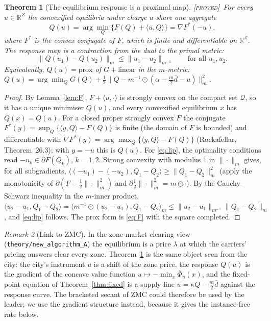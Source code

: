 \documentclass[11pt]{article}
\newtheorem{theorem}{Theorem}
\theoremstyle{definition}
\theoremstyle{remark}
\newtheorem{remark}[theorem]{Remark}
\newcommand{\R}{\mathbb{R}}
\newcommand{\cQ}{\mathcal{Q}}
\newcommand{\ip}[2]{\langle #1,#2\rangle}
\newcommand{\Qbar}{\bar Q}
\newcommand{\dbar}{\bar d}
\newcommand{\Phibar}{\overline{\Phi}}
\newcommand{\norm}[2]{\|#1\|_{#2}}
\newcommand{\PROVED}{{\normalfont\textsc{[proved]}}}
\begin{document}
\begin{theorem}[The equilibrium response is a proximal map]\label{thm:resolvent}\PROVED\
For every $u\in\R^Z$ the convexified equilibria under charge $u$ share one aggregate
\[Q(u)=\arg\min_Q\big\{F(Q)+\ip{u}{Q}\big\}=\nabla F^*(-u),\]
where $F^*$ is the convex conjugate of $F$, which is finite and differentiable on $\R^Z$. The response map is a contraction from the dual to the primal metric:
\begin{equation}\label{eq:lip}
\norm{Q(u_1)-Q(u_2)}{m}\le\norm{u_1-u_2}{m^{-1}}\qquad\text{for all }u_1,u_2 .
\end{equation}
Equivalently, $Q(u)=\mathrm{prox}$ of $G+\text{linear}$ in the $m$-metric: $Q(u)=\arg\min_Q G(Q)+\tfrac12\norm{Q-m^{-1}\odot(\alpha-\tfrac m2\dbar-u)}{m}^2$.
\end{theorem}
\begin{proof}
By Lemma~\ref{lem:F}, $F+\ip{u}{\cdot}$ is strongly convex on the compact set $\cQ$, so it has a unique minimiser $Q(u)$, and every convexified equilibrium $x$ has $\Qbar(x)=Q(u)$. For a closed proper strongly convex $F$ the conjugate $F^*(y)=\sup_Q\{\ip{y}{Q}-F(Q)\}$ is finite (the domain of $F$ is bounded) and differentiable with $\nabla F^*(y)=\arg\max_Q\{\ip yQ-F(Q)\}$ (Rockafellar, Theorem~26.3); with $y=-u$ this is $Q(u)$. For \eqref{eq:lip}, the optimality conditions read $-u_k\in\partial F(Q_k)$, $k=1,2$. Strong convexity with modulus $1$ in $\norm{\cdot}{m}$ gives, for all subgradients, $\ip{(-u_1)-(-u_2)}{Q_1-Q_2}\ge\norm{Q_1-Q_2}{m}^2$ (apply the monotonicity of $\partial(F-\tfrac12\norm{\cdot}{m}^2)$ and $\partial\tfrac12\norm{\cdot}{m}^2=m\odot\cdot$). By the Cauchy--Schwarz inequality in the $m$-inner product, $\ip{u_2-u_1}{Q_1-Q_2}=\ip{m^{-1}\odot(u_2-u_1)}{Q_1-Q_2}_m\le\norm{u_2-u_1}{m^{-1}}\norm{Q_1-Q_2}{m}$, and \eqref{eq:lip} follows. The prox form is \eqref{eq:F} with the square completed.
\end{proof}

\begin{remark}[Link to ZMC]
In the zone-market-clearing view (\texttt{theory/new\_algorithm\_A}) the equilibrium is a price $\lambda$ at which the carriers' pricing answers clear every zone. Theorem~\ref{thm:resolvent} is the same object seen from the city: the city's instrument $u$ is a shift of the zone price, the response $Q(u)$ is the gradient of the concave value function $u\mapsto-\min_x\Phibar_u(x)$, and the fixed-point equation of Theorem~\ref{thm:fixed} is a supply line $u=\kappa Q-\tfrac m2\dbar$ against the response curve. The bracketed secant of ZMC could therefore be used by the leader; we use the gradient structure instead, because it gives the instance-free rate below.
\end{remark}
\end{document}
